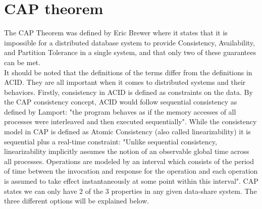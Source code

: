 \documentclass[a4paper,10pt,titlepage]{report}
\begin{document}
\section{CAP theorem}

The CAP Theorem was defined by Eric Brewer\cite{CAP} where it states that it is impossible for a distributed database system to provide Consistency, Availability, and Partition Tolerance in a single system, and that only two of these guarantees can be met.\\
\vspace{5mm}
It should be noted that the definitions of the terms differ from the definitions in ACID. They are all important when it comes to distributed systems and their behaviors. Firstly, consistency in ACID is defined as constraints on the data. By the CAP consistency concept, ACID would follow sequential consistency as defined by Lamport\cite{lamport1993how}: "the program behaves as if the memory accesses of all processes were interleaved and then executed sequentially". While the consistency model in CAP is defined as Atomic Consistency (also called linearizability) it is sequential plus a real-time constraint: "Unlike sequential consistency, linearizability implicitly assumes the notion of an observable global time across all processes. Operations are modeled by an interval which consists of the period of time between the invocation and response for the operation and each operation is assumed to take effect instantaneously at some point within this interval". \cite{CSL-TR-95-685}
\vspace{5mm}
CAP states we can only have 2 of the 3 properties in any given data-share system. The three different options will be explained below.
\end{document}
